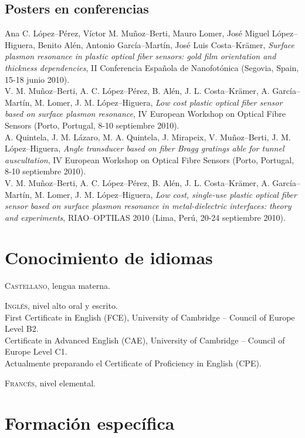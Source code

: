 \documentclass[11pt, a4paper]{article}
\newcommand{\years}[1]{\marginnote{\scriptsize #1}}
\begin{document}
\subsection*{Posters en conferencias}
\noindent
\years{2010}Ana C. López--Pérez, Víctor M. Muñoz--Berti, Mauro Lomer, José Miguel López--Higuera, Benito Alén, Antonio García--Martín, José Luis Costa--Krämer, \textit{Surface plasmon resonance in plastic optical fiber sensors: gold film orientation and thickness dependencies}, II Conferencia Española de Nanofotónica (Segovia, Spain, 15-18 junio 2010).\\
\years{2010}V. M. Muñoz--Berti, A. C. López--Pérez, B. Alén, J. L. Costa--Krämer, A. García--Martín, M. Lomer, J. M. López--Higuera, \textit{Low cost plastic optical fiber sensor based on surface plasmon resonance}, IV European Workshop on Optical Fibre Sensors (Porto, Portugal, 8-10 septiembre 2010).\\
\years{2010}A. Quintela, J. M. Lázaro, M. A. Quintela, J. Mirapeix, V. Muñoz--Berti, J. M. López--Hi\-gue\-ra, \textit{Angle transducer based on fiber Bragg gratings able for tunnel auscultation}, IV European Workshop on Optical Fibre Sensors (Porto, Portugal, 8-10 septiembre 2010).\\
\years{2010}V. M. Muñoz--Berti, A. C. López--Pérez, B. Alén, J. L. Costa--Krämer, A. García--Martín, M. Lomer, J. M. López--Higuera, \textit{Low cost, single-use plastic optical fiber sensor based on surface plasmon resonance in metal-dielectric interfaces: theory and experiments}, RIAO--OPTILAS 2010 (Lima, Perú, 20-24 septiembre 2010).


\section*{Conocimiento de idiomas} %
\noindent
\textsc{Castellano}, lengua materna.

\textsc{Inglés}, nivel alto oral y escrito.\\
First Certificate in English (FCE), University of Cambridge -- Council of Europe Level B2.\\
Certificate in Advanced English (CAE), University of Cambridge -- Council of Europe Level C1.\\
Actualmente preparando el Certificate of Proficiency in English (CPE).

\textsc{Francés}, nivel elemental.


\section*{Formación específica} %
\end{document}
